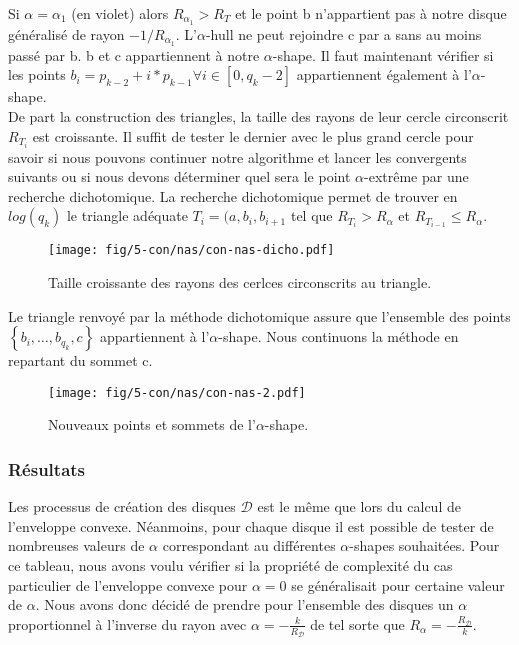 Si $\alpha = \alpha_{1}$ (en violet) alors \textbf{$R_{\alpha_{1}} > R_T$} et le point b n'appartient pas à notre disque généralisé de rayon $-1/R_{\alpha_{1}}$. L'$\alpha$-hull ne peut rejoindre c par a sans au moins passé par b. b et c appartiennent à notre $\alpha$-shape. Il faut maintenant vérifier si les points $b_i = p_{k-2} + i*p_{k-1} \forall i \in [0, q_k-2]$ appartiennent également à l'$\alpha$-shape. \\

De part la construction des triangles, la taille des rayons de leur cercle circonscrit $R_{T_{i}}$ est croissante. Il suffit de tester le dernier avec le plus grand cercle pour savoir si nous pouvons continuer notre algorithme et lancer les convergents suivants ou si nous devons déterminer quel sera le point $\alpha$-extrême par une recherche dichotomique. La recherche dichotomique permet de trouver en $log(q_k)$ le triangle adéquate $T_i = (a, b_{i}, b_{i+1}$ tel que $R_{T_i} > R_{\alpha}$ et $R_{T_{i-1}} \leq R_{\alpha}$.

\begin{figure}[H]
  \centering
  \texttt{[image: fig/5-con/nas/con-nas-dicho.pdf]}
  \caption{Taille croissante des rayons des cerlces circonscrits au triangle.}
\end{figure}

Le triangle renvoyé par la méthode dichotomique assure que l'ensemble des points $\left\{ b_{i},\ldots, b_{q_k}, c \right\}$ appartiennent à l'$\alpha$-shape. Nous continuons la méthode en repartant du sommet c.
 
\begin{figure}[H]
  \centering
  \texttt{[image: fig/5-con/nas/con-nas-2.pdf]}
  \caption{Nouveaux points et sommets de l'$\alpha$-shape.}
\end{figure}


\subsubsection{Résultats}

Les processus de création des disques $\mathcal{D}$ est le même que lors du calcul de l'enveloppe convexe. Néanmoins, pour chaque disque il est possible de tester de nombreuses valeurs de $\alpha$ correspondant au différentes $\alpha$-shapes souhaitées. Pour ce tableau, nous avons voulu vérifier si la propriété de complexité du cas particulier de l'enveloppe convexe pour $\alpha = 0$ se généralisait pour certaine valeur de $\alpha$. Nous avons donc décidé de prendre pour l'ensemble des disques un $\alpha$ proportionnel à l'inverse du rayon avec $\alpha = -\frac{k}{R_{\mathcal{D}}}$ de tel sorte que $R_{\alpha} = -\frac{R_{\mathcal{D}}}{k}$.
 

